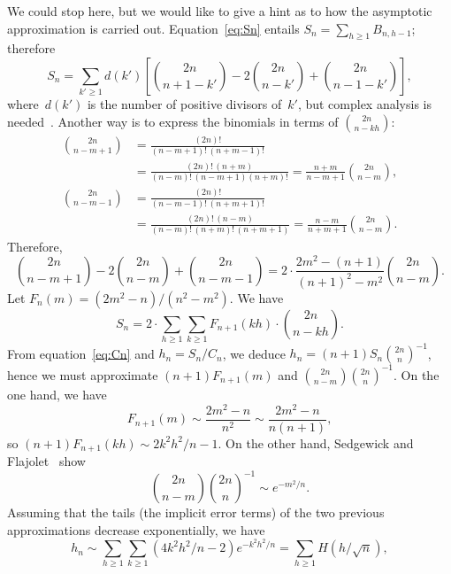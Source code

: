 \documentclass[11pt]{article}
\begin{document}
We could stop here, but we would like to give a hint as to how the
asymptotic approximation is carried out. Equation~\eqref{eq:Sn}
entails \(S_{n} = \sum_{h \geqslant 1}B_{n,h-1}\); therefore
\begin{equation*}
S_{n} = \sum_{k' \geqslant 1}d(k') %
        \left[\binom{2n}{n+1-k'} - 2\binom{2n}{n-k'}
        + \binom{2n}{n-1-k'}\right],
\end{equation*}
where~\(d(k')\) is the number of positive divisors of~\(k'\), but
complex analysis is
needed~\cite{KnuthdeBruijnRice:1972,FlajoletGourdonDumas:1995}. Another way is to express the binomials in terms of \(\binom{2n}{n-kh}\):
\begin{align*}
\binom{2n}{n-m+1} &= \frac{(2n)!}{(n-m+1)!\,(n+m-1)!}\\
                  &= \frac{(2n)!\,(n+m)}{(n-m)!\,(n-m+1)(n+m)!} 
                   = \frac{n+m}{n-m+1}\binom{2n}{n-m},\\
\binom{2n}{n-m-1} &= \frac{(2n)!}{(n-m-1)!\,(n+m+1)!}\\
                  &= \frac{(2n)!\,(n-m)}{(n-m)!\,(n+m)!\,(n+m+1)}
                   = \frac{n-m}{n+m+1}\binom{2n}{n-m}.
\end{align*}
Therefore,
\begin{equation*}
\binom{2n}{n-m+1} - 2\binom{2n}{n-m} + \binom{2n}{n-m-1}
= 2 \cdot \frac{2m^2-(n+1)}{(n+1)^2-m^2}\binom{2n}{n-m}.
\end{equation*}
Let \(F_n(m) = (2m^2-n)/(n^2-m^2)\). We have
\begin{equation*}
S_{n} = 2 \cdot \sum_{h \geqslant 1}\sum_{k \geqslant 1} F_{n+1}(kh)
\cdot \binom{2n}{n-kh}.
\end{equation*}
From equation~\eqref{eq:Cn} and \(h_n = S_n/C_n\), we deduce \(h_{n} =
(n+1)S_{n}{\binom{2n}{n}}^{-1}\), hence we must approximate
\((n+1)F_{n+1}(m)\) and \(\binom{2n}{n-m}\binom{2n}{n}^{-1}\). On the
one hand, we have
\begin{equation*}
F_{n+1}(m) \sim \frac{2m^2-n}{n^2} \sim \frac{2m^2-n}{n(n+1)},
\end{equation*}
so \((n+1)F_{n+1}(kh) \sim 2k^2h^2\!/n-1\). On the other hand,
Sedgewick and Flajolet~\cite[4.6, 4.8]{SedgewickFlajolet:1996} show
\begin{equation*}
\binom{2n}{n-m}{\binom{2n}{n}}^{-1} \sim e^{-m^2\!/n}.
\end{equation*}
Assuming that the tails (the implicit error terms) of the two previous
approximations decrease exponentially, we have
\begin{equation*}
h_{n} \sim \sum_{h \geqslant 1}\sum_{k \geqslant 1}
(4k^2h^2\!/n - 2)e^{-k^2h^2\!/n}
= \sum_{h \geqslant 1}H(h/\!\sqrt{n}), 
\end{equation*}
\end{document}
